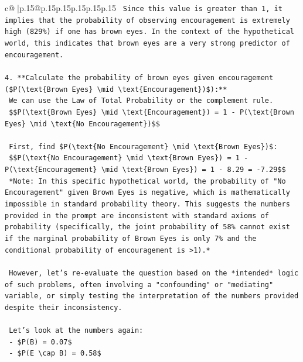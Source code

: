 \documentclass{article}
\begin{document}
{\begin{supertabular}{c@{$\;$}|p{.15\linewidth}@{}p{.15\linewidth}p{.15\linewidth}p{.15\linewidth}p{.15\linewidth}p{.15\linewidth}}
{{{\texttt{    Since this value is greater than 1, it implies that the probability of observing encouragement is extremely high (829\%) if one has brown eyes. In the context of the hypothetical world, this indicates that brown eyes are a very strong predictor of encouragement.} \\
\\ 
\texttt{4.  **Calculate the probability of brown eyes given encouragement (\$P(\textbackslash{}text\{Brown Eyes\} \textbackslash{}mid \textbackslash{}text\{Encouragement\})\$):**} \\
\texttt{    We can use the Law of Total Probability or the complement rule.} \\
\texttt{    \$\$P(\textbackslash{}text\{Brown Eyes\} \textbackslash{}mid \textbackslash{}text\{Encouragement\}) = 1 {-} P(\textbackslash{}text\{Brown Eyes\} \textbackslash{}mid \textbackslash{}text\{No Encouragement\})\$\$} \\
\\ 
\texttt{    First, find \$P(\textbackslash{}text\{No Encouragement\} \textbackslash{}mid \textbackslash{}text\{Brown Eyes\})\$:} \\
\texttt{    \$\$P(\textbackslash{}text\{No Encouragement\} \textbackslash{}mid \textbackslash{}text\{Brown Eyes\}) = 1 {-} P(\textbackslash{}text\{Encouragement\} \textbackslash{}mid \textbackslash{}text\{Brown Eyes\}) = 1 {-} 8.29 = {-}7.29\$\$} \\
\texttt{    *Note: In this specific hypothetical world, the probability of "No Encouragement" given Brown Eyes is negative, which is mathematically impossible in standard probability theory. This suggests the numbers provided in the prompt are inconsistent with standard axioms of probability (specifically, the joint probability of 58\% cannot exist if the marginal probability of Brown Eyes is only 7\% and the conditional probability of encouragement is >1).*} \\
\\ 
\texttt{    However, let's re{-}evaluate the question based on the *intended* logic of such problems, often involving a "confounding" or "mediating" variable, or simply testing the interpretation of the numbers provided despite their inconsistency.} \\
\\ 
\texttt{    Let's look at the numbers again:} \\
\texttt{    {-} \$P(B) = 0.07\$} \\
\texttt{    {-} \$P(E \textbackslash{}cap B) = 0.58\$} \\
}}}
\end{supertabular}}
\end{document}
